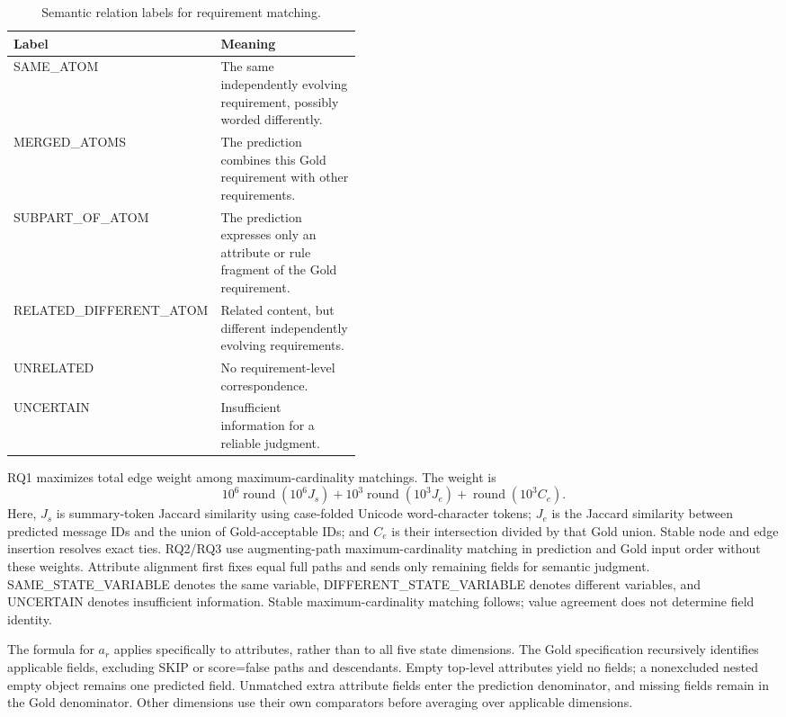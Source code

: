 \documentclass{article} %
\begin{document}
\begin{table}[htbp]
\caption{Semantic relation labels for requirement matching.}
\label{tab:semantic-relations}
\centering\normalsize
\setlength{\tabcolsep}{3pt}
\renewcommand{\arraystretch}{1.08}
\begin{tabularx}{\linewidth}{@{}>{\raggedright\arraybackslash}p{0.45\linewidth}>{\raggedright\arraybackslash}X@{}}
\toprule
Label & Meaning \\
\midrule
SAME\_ATOM & The same independently evolving requirement, possibly worded differently. \\
MERGED\_ATOMS & The prediction combines this Gold requirement with other requirements. \\
SUBPART\_OF\_ATOM & The prediction expresses only an attribute or rule fragment of the Gold requirement. \\
RELATED\_DIFFERENT\_ATOM & Related content, but different independently evolving requirements. \\
UNRELATED & No requirement-level correspondence. \\
UNCERTAIN & Insufficient information for a reliable judgment. \\
\bottomrule
\end{tabularx}
\end{table}

RQ1 maximizes total edge weight among maximum-cardinality matchings. The weight is
\[
10^6\operatorname{round}(10^6J_s)+10^3\operatorname{round}(10^3J_e)+\operatorname{round}(10^3C_e).
\]
Here, $J_s$ is summary-token Jaccard similarity using case-folded Unicode word-character tokens; $J_e$ is the Jaccard similarity between predicted message IDs and the union of Gold-acceptable IDs; and $C_e$ is their intersection divided by that Gold union. Stable node and edge insertion resolves exact ties. RQ2/RQ3 use augmenting-path maximum-cardinality matching in prediction and Gold input order without these weights. Attribute alignment first fixes equal full paths and sends only remaining fields for semantic judgment. SAME\_STATE\_VARIABLE denotes the same variable, DIFFERENT\_STATE\_VARIABLE denotes different variables, and UNCERTAIN denotes insufficient information. Stable maximum-cardinality matching follows; value agreement does not determine field identity.

The formula for $a_r$ applies specifically to attributes, rather than to all five state dimensions. The Gold specification recursively identifies applicable fields, excluding SKIP or score=false paths and descendants. Empty top-level attributes yield no fields; a nonexcluded nested empty object remains one predicted field. Unmatched extra attribute fields enter the prediction denominator, and missing fields remain in the Gold denominator. Other dimensions use their own comparators before averaging over applicable dimensions.
\end{document}
